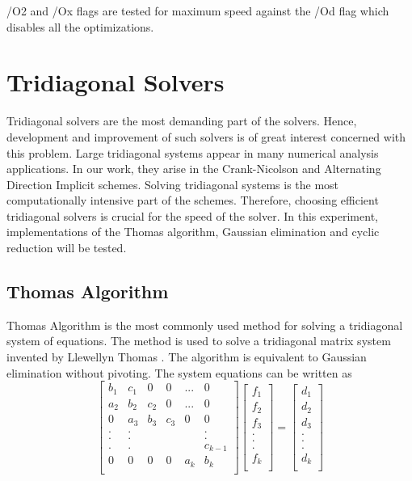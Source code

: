 \documentclass[12pt, oneside]{book}
\theoremstyle{plain}
\theoremstyle{definition}
\begin{document}
/O2 and /Ox flags are tested for maximum speed against the /Od flag which disables all the optimizations.
 
\section{Tridiagonal Solvers}
Tridiagonal solvers are the most demanding part of the solvers. Hence, development and improvement of such solvers is of great interest \cite{terekhov} \cite{chavez} \cite{hofen} \cite{fpga} concerned with this problem.  Large tridiagonal systems appear in many numerical analysis applications. In our work, they arise in the Crank-Nicolson and Alternating Direction Implicit schemes.  Solving tridiagonal systems is the most computationally intensive part of the schemes. Therefore, choosing efficient tridiagonal solvers is crucial for the speed of the solver. In this experiment, implementations of the Thomas algorithm, Gaussian elimination and cyclic reduction will be tested.

\subsection{Thomas Algorithm}
Thomas Algorithm is the most commonly used method for solving a tridiagonal system of equations. The method is used to solve a tridiagonal matrix system invented by Llewellyn Thomas \cite{thomas}. The algorithm is equivalent to Gaussian elimination without pivoting. The system equations can be written as
$$
\begin{bmatrix}  
b_1 & c_1 & 0 & 0 & ... & 0 \\ 
a_2 & b_2 & c_2 & 0 & ... & 0 \\ 
0 & a_3 & b_3 & c_3 & 0 & 0 \\ 
. & . &  &  &  & . \\ 
. & . &  &  &  & . \\ 
. & . &  &  &  & c_{k-1} \\ 
0 & 0 & 0 & 0 & a_k & b_k \\ 
\end{bmatrix} \begin{bmatrix}  
f_1 \\ 
f_2 \\ 
f_3 \\ 
.\\ 
.\\ 
.\\ 
f_k \\ 
\end{bmatrix} = \begin{bmatrix} 
d_1 \\ 
d_2 \\ 
d_3 \\ 
.\\ 
.\\ 
.\\ 
d_k \\ 
\end{bmatrix}
$$
\end{document}
